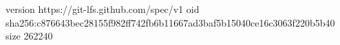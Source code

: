 version https://git-lfs.github.com/spec/v1
oid sha256:c876643bec28155f982ff742fb6b11667ad3baf5b15040ce16c3063f220b5b40
size 262240
